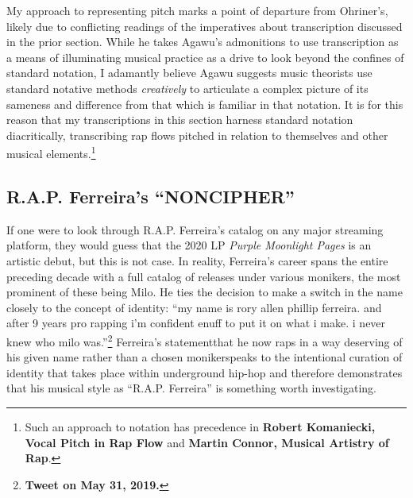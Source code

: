 My approach to representing pitch marks a point of departure from Ohriner's, likely due to conflicting readings
of the imperatives about transcription discussed in the prior section. While he takes Agawu's admonitions to use
transcription as a means of illuminating musical practice as a drive to look beyond the confines of standard 
notation, I adamantly believe Agawu suggests music theorists use standard notative methods \textit{creatively}
to articulate a complex picture of its sameness and difference from that which is familiar in that notation. It
is for this reason that my transcriptions in this section harness standard notation diacritically, transcribing
rap flows pitched in relation to themselves and other musical elements.\footnote{
    Such an approach to notation has precedence in \textbf{Robert Komaniecki, Vocal Pitch in Rap Flow} and 
    \textbf{Martin Connor, Musical Artistry of Rap}.}

\subsection*{\centering R.A.P. Ferreira's ``NONCIPHER''}

If one were to look through R.A.P. Ferreira's catalog on any major streaming platform, they would guess that
the 2020 LP \textit{Purple Moonlight Pages} is an artistic debut, but this is not case. In reality, Ferreira's
career spans the entire preceding decade with a full catalog of releases under various monikers, the most prominent
of these being Milo. He ties the decision to make a switch in the name closely to the concept of identity: ``my
name is rory allen phillip ferreira. and after 9 years pro rapping i'm confident enuff to put it on what i make.
i never knew who milo was.''\footnote{
    \textbf{Tweet on May 31, 2019.}}
Ferreira's statement\textemdash that he now raps in a way deserving of his given name rather than a chosen 
moniker\textemdash speaks to the intentional curation of identity that takes place within underground hip-hop
and therefore demonstrates that his musical style as ``R.A.P. Ferreira'' is something worth investigating.

